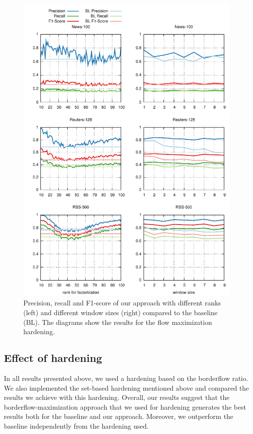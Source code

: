 \begin{figure}[t!]
\centering
\includegraphics[width = \textwidth]{chapter_three/unstructured_annotation/LD4IE_ISWC_CDCR/cdcr_results_Flow.pdf}
\caption{Precision, recall and F1-score of our approach with different ranks (left) and different window sizes (right) compared to the baseline (BL). The diagrams show the results for the flow maximization hardening.}
\label{fig:results}
\end{figure}
\afterpage{\clearpage}

\subsection{Effect of hardening}
In all results presented above, we used a hardening based on the borderflow ratio.
We also implemented the set-based hardening mentioned above and compared the results we achieve with this hardening.
Overall, our results suggest that the borderflow-maximization approach that we used for hardening generates the best results both for the baseline and our approach. 
Moreover, we outperform the baseline independently from the hardening used.

